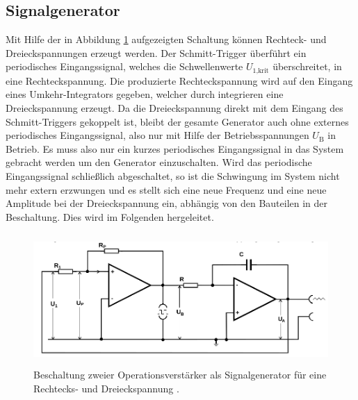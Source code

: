 \subsection{Signalgenerator}

Mit Hilfe der in Abbildung \ref{fig:signalgen} aufgezeigten Schaltung können Rechteck- und
Dreieckspannungen erzeugt werden. Der Schmitt-Trigger überführt ein periodisches Eingangssignal,
welches die Schwellenwerte $U_\text{1,krit}$ überschreitet, in eine Rechteckspannung.
Die produzierte Rechteckspannung wird auf den Eingang eines Umkehr-Integrators gegeben, welcher
durch integrieren eine Dreieckspannung erzeugt. Da die Dreieckspannung direkt mit dem Eingang des
Schmitt-Triggers gekoppelt ist, bleibt der gesamte Generator auch ohne externes
periodisches Eingangssignal, also nur mit Hilfe der Betriebsspannungen $U_\text{B}$ in Betrieb.
Es muss also nur ein kurzes periodisches Eingangssignal in das System gebracht werden um
den Generator einzuschalten. Wird das periodische Eingangssignal schließlich abgeschaltet, so ist die
Schwingung im System nicht mehr extern erzwungen und es stellt sich eine neue Frequenz und eine
neue Amplitude bei der Dreieckspannung ein, abhängig von den Bauteilen in der Beschaltung.
Dies wird im Folgenden hergeleitet.

\begin{figure}
  \centering
  \includegraphics[height=5cm]{ImmerDieseNorweger/signalgenerator.png}
  \caption{Beschaltung zweier Operationsverstärker als Signalgenerator für eine Rechtecks- und Dreieckspannung \cite{anleitung}.}
  \label{fig:signalgen}
\end{figure}

